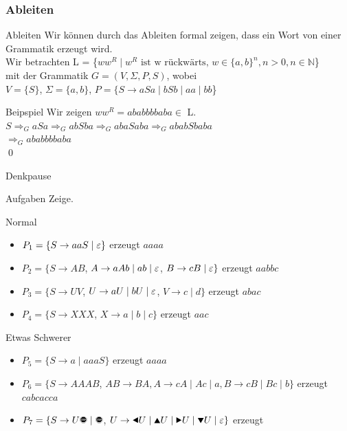\subsubsection{Ableiten}
\begin{frame}[fragile]{Ableiten}
    Wir können durch das Ableiten formal zeigen, dass ein Wort von einer Grammatik erzeugt wird.\\
    \small{Wir betrachten L = \{$ww^R\;|\;w^R\text{ ist w rückwärts, }w \in \{a, b\}^n, n>0, n\in \mathbb{N}$\}\\
    mit der Grammatik $G=(V,\Sigma,P,S)$, wobei\\
    $V=\{S\}$, $\Sigma=\{a,b\}$, $P = \{S \rightarrow aSa \mid bSb \mid aa \mid bb$\}}
    \begin{exampleblock}{Beipspiel}
        Wir zeigen $ww^R = ababbbbaba \in$ L.\\
        \small{$S\Longrightarrow_G aSa \Longrightarrow_G abSba \Longrightarrow_G  abaSaba \Longrightarrow_G ababSbaba$ \\ $\Longrightarrow_G ababbbbaba$}\\\qed
    \end{exampleblock}
\end{frame}

{
\begin{frame}{Denkpause}
    \begin{alertblock}{Aufgaben}
    Zeige.
    \end{alertblock}
    \begin{block}{Normal}
    \begin{itemize}
        \item $P_1=\{S\rightarrow aaS\;|\;\varepsilon\}$ erzeugt $aaaa$
        \item $P_2=\{S\rightarrow AB$, $A\rightarrow aAb \;|\; ab\; |\;\varepsilon$, $B\rightarrow cB \;|\; \varepsilon\}$ erzeugt $aabbc$
        \item $P_3=\{S\rightarrow UV$, $U\rightarrow aU \;|\; bU \; |\; \varepsilon$, $V\rightarrow c \;|\; d\}$ erzeugt $abac$
        \item $P_4=\{S\rightarrow XXX$, $X\rightarrow a \;|\; b \;|\; c\}$ erzeugt $aac$
    \end{itemize}
    \end{block}
    \begin{block}{Etwas Schwerer}
    \begin{itemize}
        \item $P_5=\{S\rightarrow a \;|\; aaaS\}$ erzeugt $aaaa$
        \item $P_6=\{S\rightarrow AAAB$, $AB\rightarrow BA, 
        A\rightarrow cA \;|\; Ac \;|\; a, 
        B\rightarrow cB \;|\; Bc \;|\; b\}$ erzeugt $cabcacca$
        \item $P_7=\{S\rightarrow U\text{\Stopsign} \;|\; \text{\Stopsign}$, $U\rightarrow \text{\Rewind} U \;|\; \text{\MoveUp} U \;|\; \text{\Forward} U \;|\; \text{\MoveDown} U \;|\;\emptyWord\}$ erzeugt \Forward\Stopsign
    \end{itemize}
    \end{block}
\end{frame}
}

